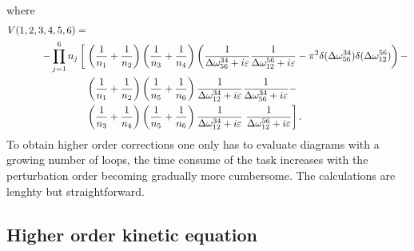 where 
\begin{equation}
    \begin{aligned}
        V(1,2,3,4,5,6) =&
        \\
        -\prod_{j=1}^{6}n_j\left[ \vphantom{\frac{1}{n_7}} \right.
        &\left( \frac{1}{n_1} +\frac{1}{n_2} \right) \left( \frac{1}{n_3} +\frac{1}{n_4} \right)
        \left( \frac{1}{\delomega^{34}_{56} + i\varepsilon}\frac{1}{\delomega^{56}_{12} + i\varepsilon} - \pi^2\delta(\delomega^{34}_{56})\delta(\delomega^{56}_{12})\right)-  
        \\
        &\left( \frac{1}{n_1} +\frac{1}{n_2} \right) \left( \frac{1}{n_5} +\frac{1}{n_6} \right)
        \frac{1}{\delomega^{34}_{12} + i\varepsilon}\frac{1}{\delomega^{34}_{56} + i\varepsilon} -
        \\
        &\left( \frac{1}{n_3} +\frac{1}{n_4} \right) \left( \frac{1}{n_5} +\frac{1}{n_6} \right)
        \frac{1}{\delomega^{34}_{12} + i\varepsilon}\left.\frac{1}{\delomega^{56}_{12} + i\varepsilon}
        \right].
    \end{aligned}
\end{equation}
To obtain higher order corrections one only has to evaluate diagrams with a growing number of loops, the time consume of the task increases with the perturbation order becoming
gradually more cumbersome. The calculations are lenghty but straightforward. \\
\subsection{Higher order kinetic equation}

